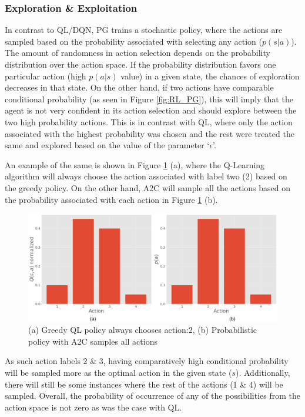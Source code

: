 \subsubsection{Exploration \& Exploitation}
\label{subsec:RL_PG_exploration_n_exploitation}

In contrast to QL/DQN, PG trains a stochastic policy, where the actions are sampled based on the probability associated with selecting any action ($p(s|a)$). The amount of randomness in action selection depends on the probability distribution over the action space. If the probability distribution favors one particular action (high $p(a|s)$ value) in a given state, the chances of exploration decreases in that state. On the other hand, if two actions have comparable conditional probability (as seen in  Figure \ref{fig:RL_PG}), this will imply that the agent is not very confident in its action selection and should explore between the two high probability actions. This is in contrast with QL, where only the action associated with the highest probability was chosen and the rest were treated the same and explored based on the value of the parameter `$\epsilon$'.

An example of the same is shown in Figure \ref{fig:A2C_is_probabilistic} (a), where the Q-Learning algorithm will always choose the action associated with label two (2) based on the greedy policy. On the other hand, A2C will sample all the actions based on the probability associated with each action in Figure \ref{fig:A2C_is_probabilistic} (b). 
\begin{figure}[h!]
    \centering
    \includegraphics[width=\textwidth]{Figures/Ch_RL/A2C_vs_QL.png}
    \caption{(a) Greedy QL policy always chooses action:2, (b) Probabilistic policy with A2C samples all actions}
    \label{fig:A2C_is_probabilistic}
\end{figure}

As such action labels 2 \& 3, having comparatively high conditional probability will be sampled more as the optimal action in the given state ($s$). Additionally, there will still be some instances where the rest of the actions (1 \& 4) will be sampled. Overall, the probability of occurrence of any of the possibilities from the action space is not zero as was the case with QL.

